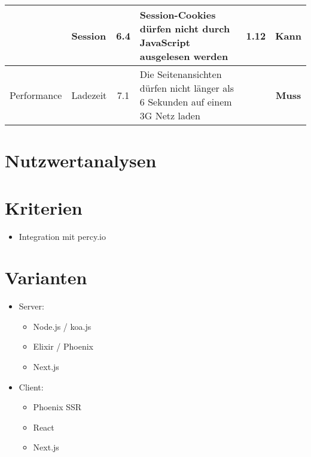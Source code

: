 \begin{longtable}[]{@{}p{1.9cm}p{2.5cm}cp{5.5cm}cc@{}}
                             & Session                    & 6.4 & Session-Cookies dürfen nicht durch JavaScript ausgelesen werden                                             & 1.12 & Kann                \\
  \midrule
  Performance                & Ladezeit                   & 7.1 & Die Seitenansichten dürfen nicht länger als 6 Sekunden auf einem 3G Netz laden                              &      & \textbf{Muss}       \\
  \bottomrule
\end{longtable}


\clearpage
\section{Nutzwertanalysen}\label{nutzwertanalysen}

\section{Kriterien}\label{kriterien}

\begin{itemize}
  \tightlist
  \item
        Integration mit percy.io
\end{itemize}

\section{Varianten}\label{varianten}

\begin{itemize}
  \tightlist
  \item
        Server:
        \begin{itemize}
          \tightlist
          \item
                Node.js / koa.js
          \item
                Elixir / Phoenix
          \item
                Next.js
        \end{itemize}
\end{itemize}

\begin{itemize}
  \tightlist
  \item
        Client:
        \begin{itemize}
          \tightlist
          \item
                Phoenix SSR
          \item
                React
          \item
                Next.js
        \end{itemize}
\end{itemize}

